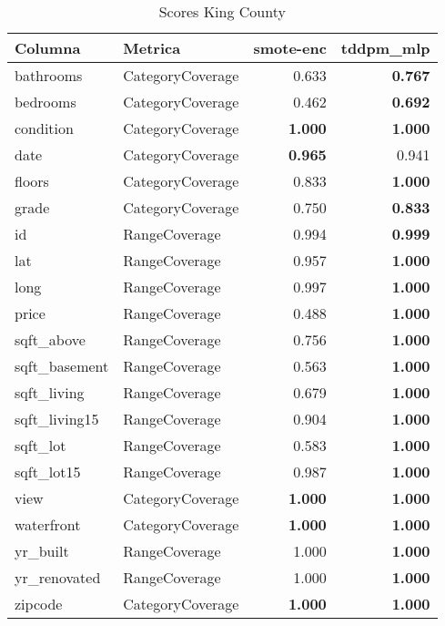 \begin{table}[H]
\centering
\caption{Scores King County}
\label{table-coverage-king county-a-2}
\begin{tabular}{|l|l|r|r|}
\hline
\rowcolor[gray]{0.8}
Columna & Metrica & smote-enc & tddpm\_mlp \\
\hline bathrooms & CategoryCoverage & 0.633 & \bfseries 0.767 \\
\hline bedrooms & CategoryCoverage & 0.462 & \bfseries 0.692 \\
\hline condition & CategoryCoverage & \bfseries 1.000 & \bfseries 1.000 \\
\hline date & CategoryCoverage & \bfseries 0.965 & 0.941 \\
\hline floors & CategoryCoverage & 0.833 & \bfseries 1.000 \\
\hline grade & CategoryCoverage & 0.750 & \bfseries 0.833 \\
\hline id & RangeCoverage & 0.994 & \bfseries 0.999 \\
\hline lat & RangeCoverage & 0.957 & \bfseries 1.000 \\
\hline long & RangeCoverage & 0.997 & \bfseries 1.000 \\
\hline price & RangeCoverage & 0.488 & \bfseries 1.000 \\
\hline sqft\_above & RangeCoverage & 0.756 & \bfseries 1.000 \\
\hline sqft\_basement & RangeCoverage & 0.563 & \bfseries 1.000 \\
\hline sqft\_living & RangeCoverage & 0.679 & \bfseries 1.000 \\
\hline sqft\_living15 & RangeCoverage & 0.904 & \bfseries 1.000 \\
\hline sqft\_lot & RangeCoverage & 0.583 & \bfseries 1.000 \\
\hline sqft\_lot15 & RangeCoverage & 0.987 & \bfseries 1.000 \\
\hline view & CategoryCoverage & \bfseries 1.000 & \bfseries 1.000 \\
\hline waterfront & CategoryCoverage & \bfseries 1.000 & \bfseries 1.000 \\
\hline yr\_built & RangeCoverage & 1.000 & \bfseries 1.000 \\
\hline yr\_renovated & RangeCoverage & 1.000 & \bfseries 1.000 \\
\hline zipcode & CategoryCoverage & \bfseries 1.000 & \bfseries 1.000 \\
\hline
\end{tabular}
\end{table}
